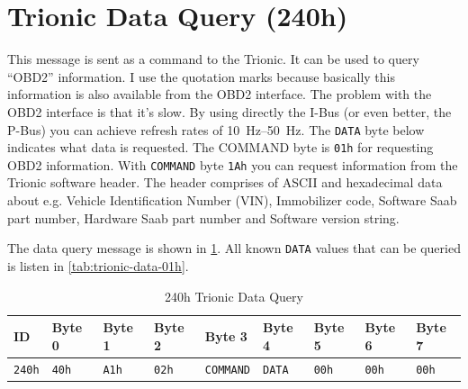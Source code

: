 \documentclass[11pt,a4paper]{book}
\begin{document}
\section{Trionic Data Query (240h)}
This message is sent as a command to the Trionic. It can be used to query
\enquote{OBD2} information. I use the quotation marks because basically this
information is also available from the OBD2 interface. The problem with the
OBD2 interface is that it's slow. By using directly the I-Bus (or even better,
the P-Bus) you can achieve refresh rates of \SIrange{10}{50}{\hertz}. The
\texttt{DATA} byte below
indicates what data is requested. The COMMAND byte is \texttt{01h} for requesting
OBD2 information. With \texttt{COMMAND} byte \texttt{1Ah} you can request information
from the Trionic software header. The header comprises of ASCII and
hexadecimal data about e.g. Vehicle Identification Number (VIN), Immobilizer
code, Software Saab part number, Hardware Saab part number and Software
version string.

The data query message is shown in \cref{tab:240h}. All known \texttt{DATA} values that can be queried is listen in
\cref{tab:trionic-data-01h}.

\begin{table}
    \centering
    \begin{tabular}{lllllllll}
        ID & Byte 0 & Byte 1 & Byte 2 & Byte 3 & Byte 4 & Byte 5 & Byte 6 & Byte 7 \\
        \midrule
        \texttt {240h} & \texttt{40h} & \texttt{A1h} & \texttt{02h} &
        \texttt{COMMAND} &
        \texttt{DATA} & \texttt{00h} & \texttt{00h}& \texttt{00h}
    \end{tabular}
    \caption{240h Trionic Data Query}
    \label{tab:240h}
\end{table}
\end{document}
